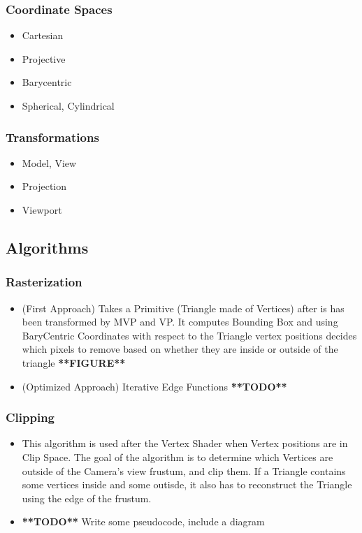 \documentclass{article}
\begin{document}
\subsubsection{Coordinate Spaces}
\begin{itemize}
	\item Cartesian
	\item Projective
	\item Barycentric
	\item Spherical, Cylindrical
\end{itemize}
\subsubsection{Transformations}
\begin{itemize}
	\item Model, View
	\item Projection
	\item Viewport
\end{itemize}
\subsection{Algorithms}
\subsubsection{Rasterization}
\begin{itemize}
	\item (First Approach) Takes a Primitive (Triangle made of Vertices) after is has been transformed by MVP and VP. It computes Bounding Box and using BaryCentric Coordinates with respect to the Triangle vertex positions decides which pixels to remove based on whether they are inside or outside of the triangle \textbf{**FIGURE**}
	\item (Optimized Approach) Iterative Edge Functions \textbf{**TODO**}
\end{itemize}
\subsubsection{Clipping}
\begin{itemize}
\item This algorithm is used after the Vertex Shader when Vertex positions are in Clip Space. The goal of the algorithm is to determine which Vertices are outside of the Camera's view frustum, and clip them. If a Triangle contains some vertices inside and some outisde, it also has to reconstruct the Triangle using the edge of the frustum.
\item \textbf{**TODO**} Write some pseudocode, include a diagram
\end{itemize}
\end{document}
